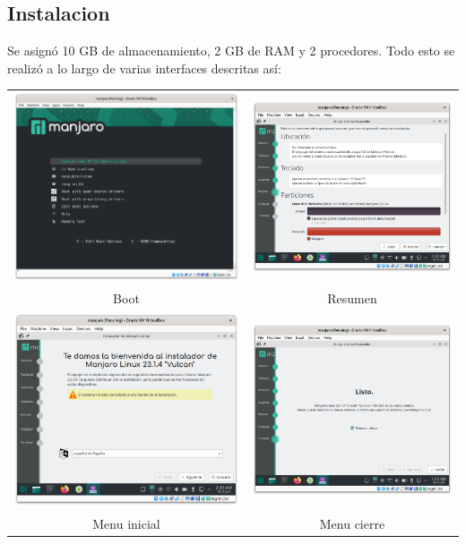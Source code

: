 \documentclass{article}
\begin{document}
    \subsection{Instalacion}
    Se asignó 10 GB de almacenamiento, 2 GB de RAM y 2 procedores. Todo esto se realizó a lo largo de varias interfaces descritas así:
    \\
    \begin{tabular}{cc}
        \includegraphics[width=.4\linewidth,valign=m]{vm/boot.png} & \includegraphics[width=.4\linewidth,valign=m]{vm/detalles.png} \\
        Boot & Resumen \\
        \includegraphics[width=.4\linewidth,valign=m]{vm/instalacion.png} & \includegraphics[width=.4\linewidth,valign=m]{vm/final.png} \\
        Menu inicial & Menu cierre \\
    \end{tabular}
\end{document}
